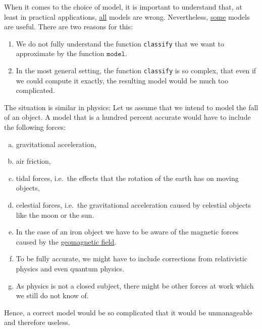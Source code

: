 When it comes to the choice of model, it is important to understand that, at least in practical applications,
\underline{all} models are wrong.  Nevertheless, \underline{some} models are useful.  There are two reasons for this:
\begin{enumerate}
\item We do not fully understand the function \texttt{classify} that we want to approximate by the function $\mathtt{model}$.
\item In the most general setting, the function \texttt{classify} is so complex, that even if we could compute
      it exactly, the resulting model would be much too complicated.
\end{enumerate}
The situation is similar in physics: Let us assume that we intend to model the fall of an object.  A model that is a
hundred percent accurate would have to include the following forces:
\begin{enumerate}[(a)]
\item gravitational acceleration,
\item air friction, 
\item tidal forces, i.e.~the effects that the rotation of the earth has on moving objects,
\item celestial forces, i.e.~the gravitational acceleration caused by celestial objects like the moon or the
      sun.
\item In the case of an iron object we have to be aware of the magnetic forces
      caused by the \href{https://www.britannica.com/science/geomagnetic-field}{geomagnetic field}.
\item To be fully accurate, we might have to include corrections from relativistic physics and even quantum
      physics.   
\item As physics is not a closed subject, there might be other forces at work which we still do not know of. 
\end{enumerate}
Hence, a correct model would be so complicated that it would be unmanageable and therefore useless. 

